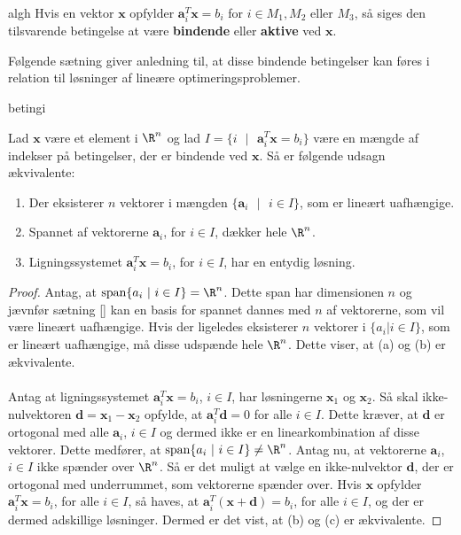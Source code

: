 %
\begin{defn}{}{algh}
Hvis en vektor $\textbf{x}$ opfylder $\textbf{a}^T_i\textbf{x}= b_i$ for $i \in M_1, M_2 \text{ eller } M_3$, så siges den tilsvarende betingelse at være \textbf{bindende} eller \textbf{aktive} ved $\textbf{x}$.
\end{defn}\noindent
%
Følgende sætning giver anledning til, at disse bindende betingelser kan føres i relation til løsninger af lineære optimeringsproblemer.
%
\begin{thm}{}{betingi}

Lad $\textbf{x}$ være et element i $\R^n$ og lad $I=\{i \text{ } | \text{ } \textbf{a}^T_i\textbf{x}=b_i\}$ være en mængde af indekser på betingelser, der er bindende ved $\textbf{x}$.
Så er følgende udsagn ækvivalente:
%
\begin{enumerate}[label=(\alph*)]
\item Der eksisterer $n$ vektorer i mængden $\{\textbf{a}_i \text{ } | \text{ } i \in I \}$, som er lineært uafhængige.
\item Spannet af vektorerne $\textbf{a}_i$, for $i \in I$, dækker hele $\R^n$.
\item Ligningssystemet $\textbf{a}^T_i\textbf{x}= b_i$, for $i \in I$, har en entydig løsning.
\end{enumerate}
\end{thm}
%
\begin{proof}
Antag, at $\text{span}\{a_i \text{ } | \text{ } i \in I\}= \R^n$.
Dette span har dimensionen $n$ og jævnfør sætning \ref{} %
kan en basis for spannet dannes med $n$ af vektorerne, som vil være lineært uafhængige.
%
Hvis der ligeledes eksisterer $n$ vektorer i $\{a_i|i \in I\}$, som er lineært uafhængige, må disse udspænde hele $\R^n$.
Dette viser, at (a) og (b) er ækvivalente.\\\\
%
Antag at ligningssystemet $\textbf{a}^T_i\textbf{x}=b_i$, $i \in I$, har løsningerne $\textbf{x}_1$ og $\textbf{x}_2$.
Så skal ikke-nulvektoren $\textbf{d} = \textbf{x}_1 - \textbf{x}_2$ opfylde, at $\textbf{a}^T_i\textbf{d}=0$ for alle $i \in I$.
Dette kræver, at $\textbf{d}$ er ortogonal med alle $\textbf{a}_i$, $i \in I$ og dermed ikke er en linearkombination af disse vektorer.
Dette medfører, at $\text{span}\{a_i \text{ } | \text{ } i \in I\} \neq \R^n$.
%
Antag nu, at vektorerne $\textbf{a}_i$, $i \in I$ ikke spænder over $\R^n$.
Så er det muligt at vælge en ikke-nulvektor $\textbf{d}$, der er ortogonal med underrummet, som vektorerne spænder over.
Hvis $\textbf{x}$ opfylder  $\textbf{a}^T_i\textbf{x}= b_i$, for alle $i \in I$, så haves, at $\textbf{a}^T_i(\textbf{x}+\textbf{d})= b_i$, for alle $i \in I$, og der er dermed adskillige løsninger.
Dermed er det vist, at (b) og (c) er ækvivalente.
\end{proof}\\
